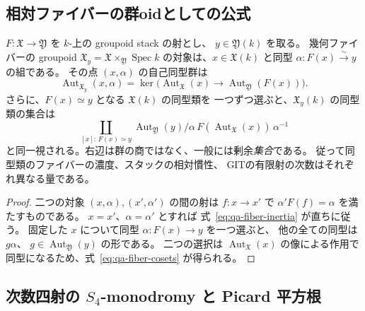 \subsection{相対ファイバーの群oidとしての公式}

\begin{proposition}[忘却射の幾何ファイバーと慣性核]
\label{prop:qa-forgetful-homotopy-fiber}
$F:\mathfrak X\to\mathfrak Y$ を $k$-上の groupoid stack の射とし、
$y\in\mathfrak Y(k)$ を取る。
幾何ファイバーの groupoid
$\mathfrak X_y=\mathfrak X\times_{\mathfrak Y}\operatorname{Spec}k$
の対象は、$x\in\mathfrak X(k)$ と同型
$\alpha:F(x)\xrightarrow{\sim}y$ の組である。
その点 $(x,\alpha)$ の自己同型群は
\[
 \operatorname{Aut}_{\mathfrak X_y}(x,\alpha)
 =\ker\bigl(\operatorname{Aut}_{\mathfrak X}(x)
       \longrightarrow\operatorname{Aut}_{\mathfrak Y}(F(x))\bigr).
 \tag{Fib-I}\label{eq:qa-fiber-inertia}
\]
さらに、$F(x)\simeq y$ となる $\mathfrak X(k)$ の同型類を
一つずつ選ぶと、$\mathfrak X_y(k)$ の同型類の集合は
\[
 \coprod_{[x]:\,F(x)\simeq y}
 \operatorname{Aut}_{\mathfrak Y}(y)\Big/
  \alpha\,F(\operatorname{Aut}_{\mathfrak X}(x))\,\alpha^{-1}
 \tag{Fib-C}\label{eq:qa-fiber-cosets}
\]
と同一視される。右辺は群の商ではなく、一般には剰余\emph{集合}である。
従って同型類のファイバーの濃度、スタックの相対慣性、
GITの有限射の次数はそれぞれ異なる量である。
\end{proposition}
\begin{proof}
二つの対象 $(x,\alpha),(x',\alpha')$ の間の射は
$f:x\to x'$ で $\alpha'F(f)=\alpha$ を満たすものである。
$x=x'$、$\alpha=\alpha'$ とすれば
式~\eqref{eq:qa-fiber-inertia} が直ちに従う。
固定した $x$ について同型 $\alpha:F(x)\to y$ を一つ選ぶと、
他の全ての同型は $g\alpha$、
$g\in\operatorname{Aut}_{\mathfrak Y}(y)$ の形である。
二つの選択は $\operatorname{Aut}_{\mathfrak X}(x)$ の像による作用で
同型になるため、式~\eqref{eq:qa-fiber-cosets} が得られる。
\end{proof}


\subsection{次数四射の \texorpdfstring{$S_4$}{S4}-monodromy と Picard 平方根}

